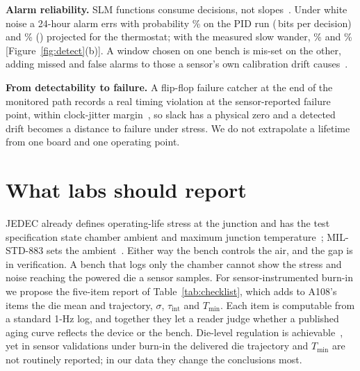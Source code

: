 \documentclass[10pt,twocolumn]{article}
\newcommand{\Tmin}{T_{\min}}
\newcommand{\tint}{\tau_{\mathrm{int}}}
\begin{document}
\textbf{Alarm reliability.} SLM functions consume decisions, not slopes~\cite{kashyap}. Under white noise a 24-hour alarm errs with probability \vPerrPidBound\% on the PID run (\vCpidBound\,bits per decision) and \vPerrBbBound\% (\vCbbBound) projected for the thermostat; with the measured slow wander, \vPerrPidLrv\% and \vPerrBbLrv\% [Figure~\ref{fig:detect}(b)]. A window chosen on one bench is mis-set on the other, adding missed and false alarms to those a sensor's own calibration drift causes~\cite{anik}.

\textbf{From detectability to failure.} A flip-flop failure catcher at the end of the monitored path records a real timing violation at the sensor-reported failure point, within clock-jitter margin~\cite{sbcci25}, so slack has a physical zero and a detected drift becomes a distance to failure under stress. We do not extrapolate a lifetime from one board and one operating point.

\section{What labs should report}

JEDEC already defines operating-life stress at the junction and has the test specification state chamber ambient and maximum junction temperature~\cite{jedec}; MIL-STD-883 sets the ambient~\cite{mil}. Either way the bench controls the air, and the gap is in verification. A bench that logs only the chamber cannot show the stress and noise reaching the powered die a sensor samples. For sensor-instrumented burn-in we propose the five-item report of Table~\ref{tab:checklist}, which adds to A108's items the die mean and trajectory, $\sigma$, $\tint$ and $\Tmin$. Each item is computable from a standard 1-Hz log, and together they let a reader judge whether a published aging curve reflects the device or the bench. Die-level regulation is achievable~\cite{sobas}, yet in sensor validations under burn-in the delivered die trajectory and $\Tmin$ are not routinely reported; in our data they change the conclusions most.
\end{document}
